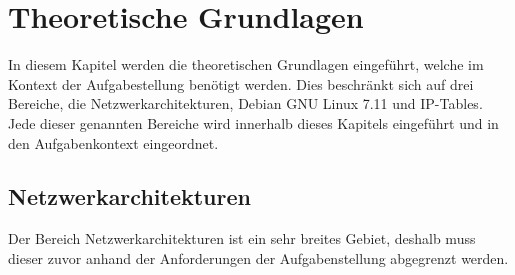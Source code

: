 \documentclass[
a4paper,     %
 headsepline, %
footsepline, %
titlepage,   %
 halfparskip,     %
 fleqn,       %
12pt         %
]{scrartcl}  %
\begin{document}
\section{Theoretische Grundlagen}
In diesem Kapitel werden die theoretischen Grundlagen eingeführt, welche im Kontext der Aufgabestellung benötigt werden. Dies beschränkt sich auf drei Bereiche, die Netzwerkarchitekturen, Debian GNU Linux 7.11 und IP-Tables. Jede dieser genannten Bereiche wird innerhalb dieses Kapitels eingeführt und in den Aufgabenkontext eingeordnet. 
\subsection{Netzwerkarchitekturen}
Der Bereich Netzwerkarchitekturen ist ein sehr breites Gebiet, deshalb muss dieser zuvor anhand der Anforderungen der Aufgabenstellung abgegrenzt werden.
\end{document}
